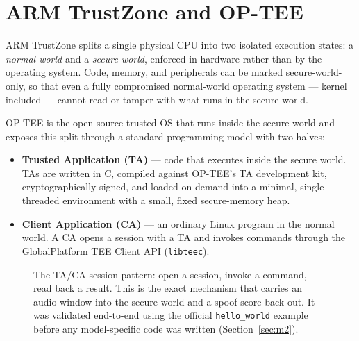 \documentclass[11pt,a4paper]{report}
\newcommand{\code}[1]{\texttt{\small #1}}
\begin{document}
\section{ARM TrustZone and OP-TEE}
\label{sec:trustzone}

ARM TrustZone splits a single physical CPU into two isolated execution states: a \textit{normal
world} and a \textit{secure world}, enforced in hardware rather than by the operating system. Code,
memory, and peripherals can be marked secure-world-only, so that even a fully compromised
normal-world operating system --- kernel included --- cannot read or tamper with what runs in the
secure world.

OP-TEE is the open-source trusted OS that runs inside the secure world and exposes this split
through a standard programming model with two halves:

\begin{itemize}[leftmargin=1.4em]
  \item \textbf{Trusted Application (TA)} --- code that executes inside the secure world. TAs are
  written in C, compiled against OP-TEE's TA development kit, cryptographically signed, and loaded
  on demand into a minimal, single-threaded environment with a small, fixed secure-memory heap.
  \item \textbf{Client Application (CA)} --- an ordinary Linux program in the normal world. A CA
  opens a session with a TA and invokes commands through the GlobalPlatform TEE Client API
  (\code{libteec}).
\end{itemize}

\begin{figure}[H]
\centering
{}
\caption{The TA/CA session pattern: open a session, invoke a command, read back a result. This is
the exact mechanism that carries an audio window into the secure world and a spoof score back out.
It was validated end-to-end using the official \code{hello\_world} example before any
model-specific code was written (Section~\ref{sec:m2}).}
\label{fig:trustzone-split}
\end{figure}
\end{document}
